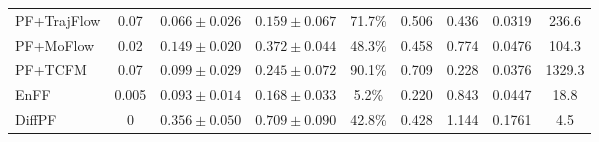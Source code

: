 \begin{table}[t]
{\begin{tabular}{lcccccccc}
PF+TrajFlow & 0.07 & $0.066 \pm 0.026$ & $0.159 \pm 0.067$ & 71.7\% & 0.506 & 0.436 & 0.0319 & 236.6 \\
PF+MoFlow & 0.02 & $0.149 \pm 0.020$ & $0.372 \pm 0.044$ & 48.3\% & 0.458 & 0.774 & 0.0476 & 104.3 \\
PF+TCFM & 0.07 & $0.099 \pm 0.029$ & $0.245 \pm 0.072$ & 90.1\% & 0.709 & 0.228 & 0.0376 & 1329.3 \\
EnFF & 0.005 & $0.093 \pm 0.014$ & $0.168 \pm 0.033$ & 5.2\% & 0.220 & 0.843 & 0.0447 & 18.8 \\
DiffPF & 0 & $0.356 \pm 0.050$ & $0.709 \pm 0.090$ & 42.8\% & 0.428 & 1.144 & 0.1761 & 4.5 \\
\hline
\end{tabular}%
}
\end{table}
